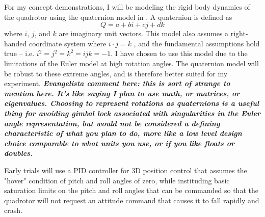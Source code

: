 \documentclass[onecolumn,10pt]{IEEEtran}
\begin{document}
For my concept demonstrations, I will be modeling the rigid body dynamics of the quadrotor using the quaternion model in \cite{greiff2017modeling}. A quaternion is defined as 
\begin{equation}
Q = a + b i + c j + d k
\end{equation}
where $i$, $j$, and $k$ are imaginary unit vectors. This model also assumes a right-handed coordinate system where $i\cdot j = k$ , and the fundamental assumptions hold true -- i.e.  $i^2 = j^2 = k^2 = ijk = -1$.  I have chosen to use this model due to the limitations of the Euler model at high rotation angles. The quaternion model will be robust to these extreme angles, and is therefore better suited for my experiment. \emph{\textbf{Evangelista comment here: this is sort of strange to mention here. It's like saying I plan to use math, or matrices, or eigenvalues. Choosing to represent rotations as quaternions is a useful thing for avoiding gimbal lock associated with singularities in the Euler angle representation, but would not be considered a defining characteristic of what you plan to do, more like a low level design choice comparable to what units you use, or if you like floats or doubles.}}

Early trials will use a PID controller for 3D position control that assumes the "hover" condition of pitch and roll angles of zero, while instituding basic saturation limits on the pitch and roll angles that can be commanded so that the quadrotor will not request an attitude command that causes it to fall rapidly and crash.
\end{document}
